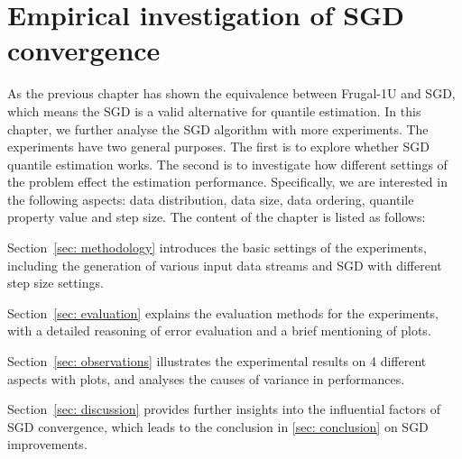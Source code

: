 
% 
\graphicspath{{Figures/Experiment_results/SGD/}{./}} 
\captionsetup[figure]{font=scriptsize,labelfont=bf}


\chapter{Empirical investigation of SGD convergence}
\label{ch: sgd_exp}

As the previous chapter has shown the equivalence between Frugal-1U and SGD, which means the SGD is a valid alternative for quantile estimation.
In this chapter, we further analyse the SGD algorithm with more experiments.
The experiments have two general purposes. The first is to explore whether SGD quantile estimation works.
The second is to investigate how different settings of the problem effect the estimation performance. Specifically, we are interested in the following aspects: data distribution, data size, data ordering, quantile property value and step size. The content of the chapter is listed as follows:

Section~\ref{sec: methodology} introduces the basic settings of the experiments, including the generation of various input data streams and SGD with different step size settings.

Section~\ref{sec: evaluation} explains the evaluation methods for the experiments, with a detailed reasoning of error evaluation and a brief mentioning of plots.

Section~\ref{sec: observations} illustrates the experimental results on 4 different aspects with plots, and analyses the causes of variance in performances.

Section~\ref{sec: discussion} provides further insights into the influential factors of SGD convergence, which leads to the conclusion in \ref{sec: conclusion} on SGD improvements.


